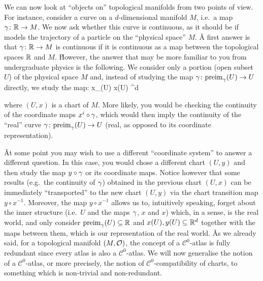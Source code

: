 We can now look at ``objects on'' topological manifolds from two points of view. For instance, consider a curve on a
$d$-dimensional manifold $M$, i.e.\ a map $\gamma\colon \mathbb{R}\to M$. We now ask whether this curve is continuous, as it should
be if models the trajectory of a particle on the ``physical space'' $M$. \v

A first answer is that $\gamma\colon \mathbb{R} \to M$ is continuous if it is continuous as a map between the topological spaces
$\mathbb{R}$ and $M$. \v

However, the answer that may be more familiar to you from undergraduate physics is the following. We consider only a
portion (open subset $U$) of the physical space $M$ and, instead of studying the map $\gamma\colon\mathrm{preim}_\gamma(U)\to U$
directly, we study the map:
\bse
x\circ \g\cl {}_\g(U) \to x(U) \se \R^d
\ese

where $(U,x)$ is a chart of $M$. More likely, you would be checking the continuity of the coordinate maps $x^i\circ
\gamma$, which would then imply the continuity of the ``real'' curve $\gamma\colon\mathrm{preim}_\gamma(U)\to U$ (real, as opposed
to its coordinate representation).

\bse
{}
\ese

\v

At some point you may wish to use a different ``coordinate system'' to answer a different question. In this case,
you would chose a different chart $(U,y)$ and then study the map $y\circ \gamma$ or its coordinate maps. Notice however
that some results (e.g.\ the continuity of $\gamma$) obtained in the previous chart $(U,x)$ can be immediately
``transported'' to the new chart $(U,y)$ via the chart transition map $y\circ x^{-1}$. Moreover, the map $y\circ
x^{-1}$ allows us to, intuitively speaking, forget about the inner structure (i.e.\ $U$ and the maps $\gamma$, $x$ and
$x$) which, in a sense, is the real world, and only consider $\mathrm{preim}_\gamma(U)\subseteq \mathbb{R}$ and $x(U),y(U)\subseteq\mathbb{R}^d$
together with the maps between them, which is our representation of the real world. \v

As we already said, for a topological manifold $(M,\mathcal{O})$, the concept of a $\mathcal{C}^0$-atlas is fully redundant
since every atlas is also a $\mathcal{C}^0$-atlas. We will now generalise the notion of a $\mathcal{C}^0$-atlas, or
more precisely, the notion of $\mathcal{C}^0$-compatibility of charts, to something which is non-trivial and
non-redundant.

